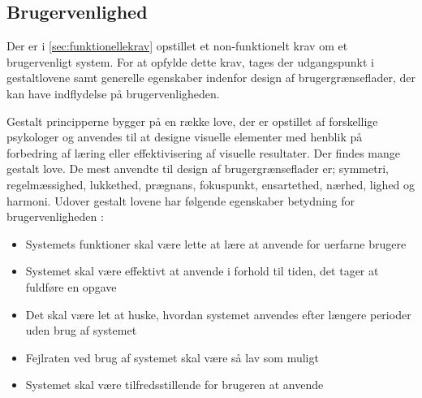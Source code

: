 \subsection{Brugervenlighed}
Der er i \autoref{sec:funktionellekrav} opstillet et non-funktionelt krav om et brugervenligt system. For at opfylde dette krav, tages der udgangspunkt i gestaltlovene samt generelle egenskaber indenfor design af brugergrænseflader, der kan have indflydelse på brugervenligheden. 

Gestalt principperne bygger på en række love, der er opstillet af forskellige psykologer og anvendes til at designe visuelle elementer med henblik på forbedring af læring eller effektivisering af visuelle resultater. Der findes mange gestalt love. De mest anvendte til design af brugergrænseflader er; symmetri, regelmæssighed, lukkethed, prægnans, fokuspunkt, ensartethed, nærhed, lighed og harmoni.\cite{Chang2002} Udover gestalt lovene har følgende egenskaber betydning for brugervenligheden \cite{ferre2001}:
\begin{itemize}
\item Systemets funktioner skal være lette at lære at anvende for uerfarne brugere
\item Systemet skal være effektivt at anvende i forhold til tiden, det tager at fuldføre en opgave
\item Det skal være let at huske, hvordan systemet anvendes efter længere perioder uden brug af systemet
\item Fejlraten ved brug af systemet skal være så lav som muligt
\item Systemet skal være tilfredsstillende for brugeren at anvende
\end{itemize}
 
 